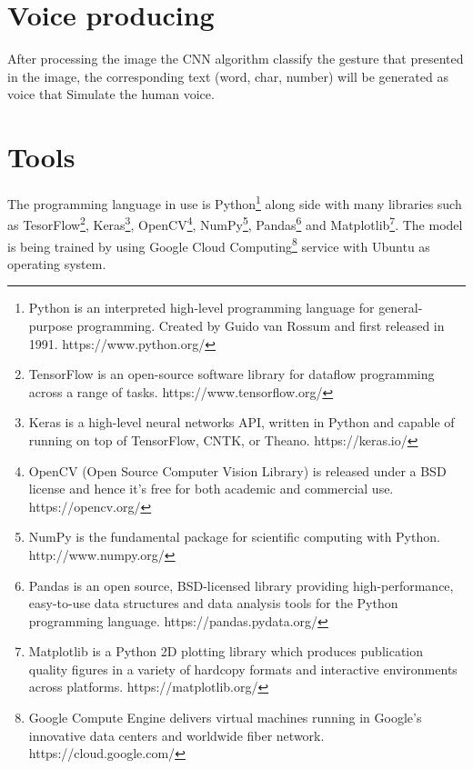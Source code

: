 \documentclass[12pt]{report}
\begin{document}
                    
                    \newpage

        \section{Voice producing}
         
            After processing the image the CNN algorithm classify the gesture
            that presented in the image, the corresponding text (word, char, number)
            will be generated as voice that Simulate the human voice. 
        
        \section{Tools}
         
            The programming language in use is Python\footnote{Python is an interpreted high-level programming language for general-purpose programming. Created by Guido van Rossum and first released in 1991. https://www.python.org/} along side with many
            libraries such as TesorFlow\footnote{TensorFlow is an open-source software library for dataflow programming across a range of tasks. https://www.tensorflow.org/},
            Keras\footnote{Keras is a high-level neural networks API, written in Python and capable of running on top of TensorFlow, CNTK, or Theano. https://keras.io/}, 
            OpenCV\footnote{OpenCV (Open Source Computer Vision Library) is released under a BSD license and hence it’s free for both academic and commercial use. https://opencv.org/}, 
            NumPy\footnote{NumPy is the fundamental package for scientific computing with Python. http://www.numpy.org/}, 
            Pandas\footnote{Pandas is an open source, BSD-licensed library providing high-performance, easy-to-use data structures and data analysis tools for the Python programming language. https://pandas.pydata.org/}
            and Matplotlib\footnote{Matplotlib is a Python 2D plotting library which produces publication quality figures in a variety of hardcopy formats and interactive environments across platforms. https://matplotlib.org/}.
            The model is being trained by using Google Cloud Computing\footnote{Google Compute Engine delivers virtual machines running in Google's innovative data centers and worldwide fiber network. https://cloud.google.com/} service with Ubuntu as operating system.
        
         
        \renewcommand\bibname{References}            
        
    
\end{document}
